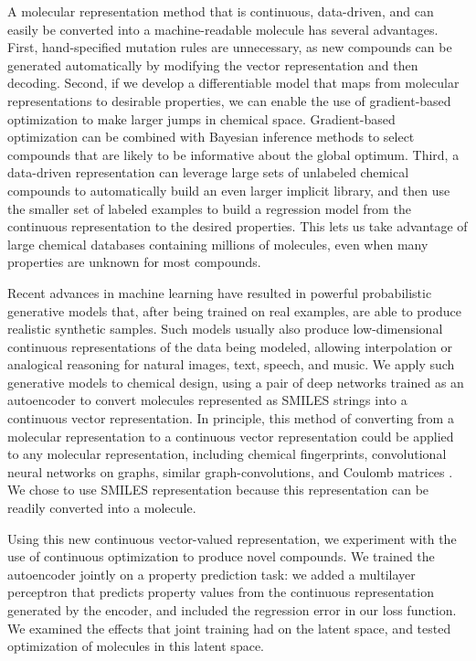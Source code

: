 A molecular representation method that is continuous, data-driven, and can easily be converted into a machine-readable molecule has several advantages.
First, hand-specified mutation rules are unnecessary, as new compounds can be generated automatically by modifying the vector representation and then decoding.
Second, if we develop a differentiable model that maps from molecular representations to desirable properties, we can enable the use of gradient-based optimization to make larger jumps in chemical space.
Gradient-based optimization can be combined with Bayesian inference methods to select compounds that are likely to be informative about the global optimum.
Third, a data-driven representation can leverage large sets of unlabeled chemical compounds to automatically build an even larger implicit library, and then use the smaller set of labeled examples to build a regression model from the continuous representation to the desired properties.
This lets us take advantage of large chemical databases containing millions of molecules, even when many properties are unknown for most compounds.

Recent advances in machine learning have resulted in powerful probabilistic generative models that, after being trained on real examples, are able to produce realistic synthetic samples.
Such models usually also produce low-dimensional continuous representations of the data being modeled, allowing interpolation or analogical reasoning for
natural images\cite{radford2015unsupervised}, text\cite{bowman2015generating}, speech, and music\cite{vandenoord_2016,Engel2017NeuralAudio}.
We apply such generative models to chemical design, using a pair of deep networks trained as an autoencoder to convert molecules represented as SMILES strings into a continuous vector representation. In principle, this method of converting from a molecular representation to a continuous vector representation could be applied to any molecular representation, including
chemical fingerprints,\cite{ECFP2010}
convolutional neural networks on graphs\cite{duvenaud2015convolutional},
 similar graph-convolutions\cite{kearnes2016molecular}, and
 Coulomb matrices \cite{Rupp_2012}. We chose to use SMILES representation because this representation can be readily converted into a molecule.

Using this new continuous vector-valued representation, we experiment with the use of continuous optimization to produce novel compounds. We trained the autoencoder jointly on a property prediction task: we added a multilayer perceptron that predicts property values from the continuous representation generated by the encoder, and included the regression error in our loss function. We examined the effects that joint training had on the latent space, and tested optimization of molecules in this latent space.


